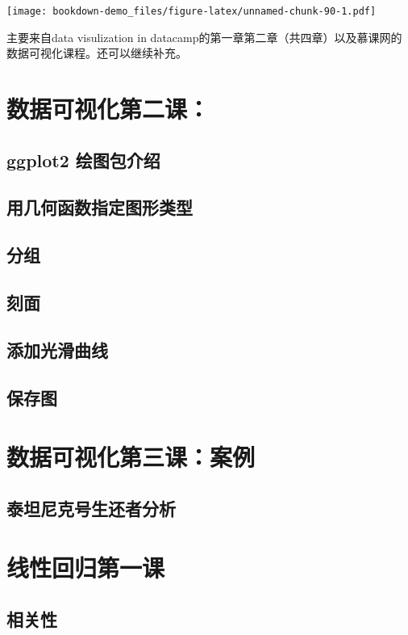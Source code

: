 \documentclass[]{book}
\begin{document}
\texttt{[image: bookdown-demo\_files/figure-latex/unnamed-chunk-90-1.pdf]}

主要来自data visulization in
datacamp的第一章第二章（共四章）以及慕课网的数据可视化课程。还可以继续补充。

\chapter{数据可视化第二课：}

\hypertarget{ggplot2-}{%
\section{ggplot2 绘图包介绍}\label{ggplot2-}}

\section{用几何函数指定图形类型}

\section{分组}

\section{刻面}

\section{添加光滑曲线}

\section{保存图}

\chapter{数据可视化第三课：案例}

\section{泰坦尼克号生还者分析}

\chapter{线性回归第一课}

\section{相关性}
\end{document}
